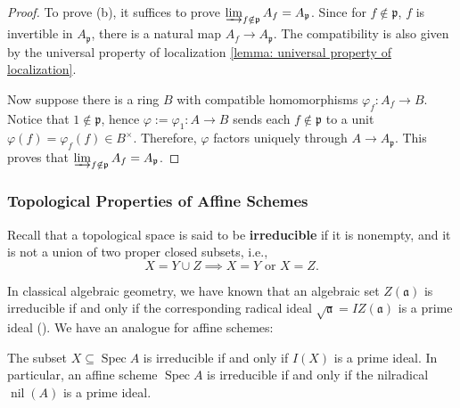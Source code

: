 \documentclass[11pt]{article}
\newcommand{\Spec}{\operatorname{Spec}}
\begin{document}
\begin{proof}
    To prove (b), it suffices to prove 
    $ \varinjlim_{f \notin \mathfrak{p}} A_{f} = A_{\mathfrak{p}} $. 
    Since for $ f \notin \mathfrak{p} $, $ f $ is invertible in $ A_{\mathfrak{p}} $, 
    there is a natural map $ A_{f} \to A_{\mathfrak{p}} $. 
    The compatibility is also given by the universal property 
    of localization \autoref{lemma: universal property of localization}. 

    Now suppose there is a ring $ B $ with compatible homomorphisms 
    $ \varphi_{f}: A_{f} \to B $. Notice that $ 1 \notin \mathfrak{p} $, 
    hence $\varphi:= \varphi_{1}: A \to B $ sends each $ f \notin \mathfrak{p} $ 
    to a unit $ \varphi(f)=\varphi_{f}(f) \in B^{\times} $. 
    Therefore, $ \varphi $ factors uniquely through $ A \to A_{\mathfrak{p}} $. 
    This proves that $ \varinjlim_{f \notin \mathfrak{p}} A_{f} = A_{\mathfrak{p}} $. 
\end{proof}

\subsubsection{Topological Properties of Affine Schemes}

Recall that a topological space is said to be \textbf{irreducible} if it is nonempty, 
and it is not a union of two proper closed subsets, i.e., 
$$ X = Y \cup Z \implies X=Y \text{ or } X=Z.$$

In classical algebraic geometry, we have known that an algebraic set $ Z(\mathfrak{a}) $ is irreducible 
if and only if the corresponding radical ideal $ \sqrt{\mathfrak{a}}=IZ(\mathfrak{a}) $ is 
a prime ideal (\cite[Corollary 1.4]{hartsAG}). We have an analogue for affine schemes: 

\begin{lemma}
    \label{lemma: irreducible in affine scheme}
    \cite[Theorem 3.10]{kemper} 
    The subset $ X \subseteq \Spec A $ is irreducible if and only if $ I(X) $ is a prime ideal. 
    In particular, an affine scheme $ \Spec A$ is irreducible if and only if the nilradical 
    $ \operatorname{nil}(A) $ is a prime ideal.  
\end{lemma}
\end{document}
